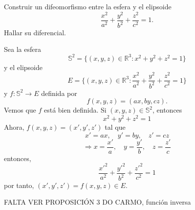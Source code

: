 \begin{ejr}[2]
  Construir un difeomorfismo entre la esfera y el elipsoide
  \[ 
    \frac{x^{2}}{a^{2}} + \frac{y^{2}}{b ^{2}} + \frac{z^{2}}{c^{2}} = 1. 
  \] 
  Hallar su diferencial.
\end{ejr}

\begin{sol}
  Sea la esfera
  \[
    \mathbb{S}^{2} = \{ (x, y, z) \in \mathbb{R}^{3} : x^{2} + y^{2} + z^{2} = 1\}
  \]
  y el elipsoide
  \[ 
    E = \{ (x, y, z) \in \mathbb{R}^{3} : \frac{x^{2}}{a^{2}} + \frac{y^{2}}{b ^{2}} + \frac{z^{2}}{c^{2}} =1 \} 
  \] 
  y $f : \mathbb{S}^{2} \to E$ definida por
  \[ 
    f(x, y, z) = (ax, by, cz) .
  \] 
  Vemos que $f$ está bien definida. Si $(x, y, z) \in \mathbb{S}^{2}$, entonces
  \[ 
    x^{2} + y^{2} + z^{2} = 1 
  \] 
  Ahora, $f(x, y, z) = (x', y', z')$ tal que 
  \[ 
    x' = a x, \quad y' = b y, \quad z' = c z 
  \] 
  \[ 
    \Rightarrow x = \frac{x'}{a}, \quad y = \frac{y'}{b}, \quad z = \frac{z'}{c} 
  \] 
  entonces,
  \[ 
    \frac{x'^{2}}{a^{2}} + \frac{y'^{2}}{b ^{2}} + \frac{z'^{2}}{c^{2}} = 1
  \] 
  por tanto, $(x', y', z') = f(x, y, z) \in E$.

  FALTA VER PROPOSICIÓN 3 DO CARMO, función inversa
\end{sol}

